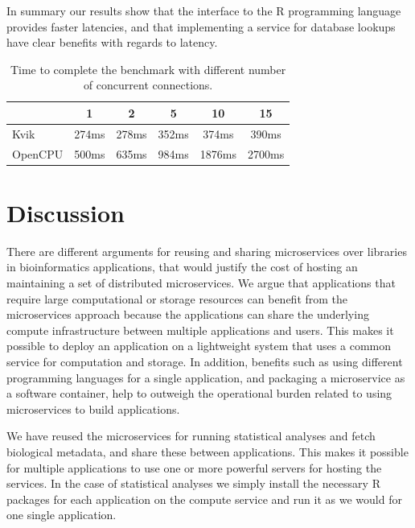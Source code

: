 In summary our results show that the interface to the R programming language
provides faster latencies, and that implementing a service for database lookups
have clear benefits with regards to latency. 

\begin{table}[h]
    \caption[]{Time to complete the benchmark with different number of
    concurrent connections.}
    \begin{tabular}{| l | c | c | c | c | c | }
        \hline 
       & 1 & 2 & 5 & 10 & 15 \\ 
      \hline			
      Kvik & 274ms & 278ms & 352ms & 374ms & 390ms\\
      \hline
      OpenCPU & 500ms & 635ms & 984ms & 1876ms & 2700ms\\
      \hline  
    \end{tabular}
\label{kvikopencpucomparison}
\end{table} 

\section{Discussion}
There are different arguments for reusing and sharing microservices over
libraries in bioinformatics applications, that would justify the cost of hosting
an maintaining a set of distributed microservices.  We argue that applications
that require large computational or storage resources can benefit from the
microservices approach because the applications can share the underlying compute
infrastructure between multiple applications and users.  This makes it possible
to deploy an application on a lightweight system that uses a common service for
computation and storage. In addition, benefits such as using different
programming languages for a single application, and packaging a microservice as
a software container, help to outweigh the operational burden related to using
microservices to build applications. 

We have reused the microservices for running statistical analyses and
fetch biological metadata, and share these between applications. This makes it
possible for multiple applications to use one or more powerful servers for
hosting the services. In the case of statistical analyses we simply install the
necessary R packages for each application on the compute service and run it as
we would for one single application. 

